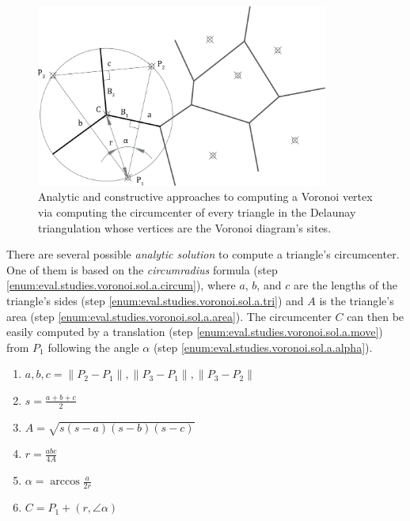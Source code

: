 \begin{figure}[htb]
  \centering
  \includegraphics[height=6cm]{fig/voronoi-solution}
  \caption[Voronoi problem partial solution]{
    Analytic and constructive approaches to computing a Voronoi vertex via
    computing the circumcenter of every triangle in the Delaunay triangulation
    whose vertices are the Voronoi diagram's sites.}%
  \label{fig:eval.studies.voronoi.sol}
\end{figure}

There are several possible \textit{analytic solution} to compute a triangle's
circumcenter.  One of them is based on the \textit{circumradius} formula (step
\ref{enum:eval.studies.voronoi.sol.a.circum}), where $a$, $b$, and $c$ are the
lengths of the triangle's sides (step
\ref{enum:eval.studies.voronoi.sol.a.tri}) and $A$ is the triangle's area (step
\ref{enum:eval.studies.voronoi.sol.a.area}).  The circumcenter $C$ can then be
easily computed by a translation (step
\ref{enum:eval.studies.voronoi.sol.a.move}) from $P_1$ following the angle
$\alpha$ (step \ref{enum:eval.studies.voronoi.sol.a.alpha}).

\begin{enumerate}
  \item $a, b, c = \lVert P_2 - P_1 \rVert, \lVert P_3 - P_1 \rVert, \lVert P_3
  - P_2 \rVert$%
  \label{enum:eval.studies.voronoi.sol.a.tri}
  \item $s = \frac{a + b + c}{2}$
  \item $A = \sqrt{s(s - a)(s - b)(s - c)}$%
  \label{enum:eval.studies.voronoi.sol.a.area}
  \item $r = \frac{abc}{4A}$%
  \label{enum:eval.studies.voronoi.sol.a.circum}
  \item $\alpha = \arccos\frac{a}{2r}$%
  \label{enum:eval.studies.voronoi.sol.a.alpha}
  \item $C = P_1 + \left(r, \angle\alpha\right)$%
  \label{enum:eval.studies.voronoi.sol.a.move}
\end{enumerate}

